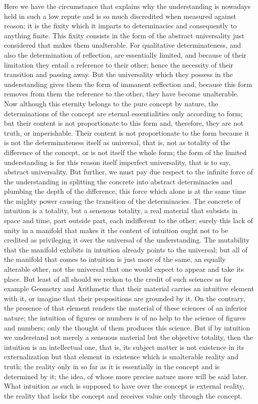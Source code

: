 Here we have the circumstance that explains
why the understanding is nowadays held in such a low repute
and is so much discredited when measured against reason;
it is the fixity which it imparts to determinacies
and consequently to anything finite.
This fixity consists in the form of the abstract universality
just considered that makes them unalterable.
For qualitative determinateness,
and also the determination of reflection,
are essentially limited,
and because of their limitation they entail a reference
to their other;
hence the necessity of their transition and passing away.
But the universality which they possess in the understanding
gives them the form of immanent reflection
and, because this form removes from them
the reference to the other,
they have become unalterable.
Now although this eternity belongs
to the pure concept by nature,
the determinations of the concept are
eternal essentialities only according to form;
but their content is not proportionate to this form
and, therefore, they are not truth, or imperishable.
Their content is not proportionate to the form
because it is not the determinateness itself as universal,
that is, not as totality of the difference of the concept,
or is not itself the whole form;
the form of the limited understanding is
for this reason itself imperfect universality,
that is to say, abstract universality.
But further, we must pay due respect to the
infinite force of the understanding
in splitting the concrete into abstract determinacies
and plumbing the depth of the difference,
this force which alone is at the same time
the mighty power causing the transition of the determinacies.
The concrete of intuition is a totality,
but a sensuous totality,
a real material that subsists in space and time,
part outside part, each indifferent to the other;
surely this lack of unity in a manifold that
makes it the content of intuition ought not to be credited
as privileging it over the universal of the understanding.
The mutability that the manifold exhibits
in intuition already points to the universal;
but all of the manifold that comes to intuition is
just more of the same, an equally alterable other,
not the universal that one would expect to appear and take its place.
But least of all should we reckon to the credit of such sciences
as for example Geometry and Arithmetic
that their material carries an intuitive element with it,
or imagine that their propositions are grounded by it.
On the contrary, the presence of that element renders
the material of these sciences of an inferior nature;
the intuition of figures or numbers is
of no help to the science of figures and numbers;
only the thought of them produces this science.
But if by intuition we understand
not merely a sensuous material
but the objective totality,
then the intuition is an intellectual one, that is,
its subject matter is not existence in its externalization
but that element in existence which is
unalterable reality and truth;
the reality only in so far as it is essentially
in the concept and is determined by it;
the idea, of whose more precise nature more will be said later.
What intuition as such is supposed to have
over the concept is external reality,
the reality that lacks the concept
and receives value only through the concept.

